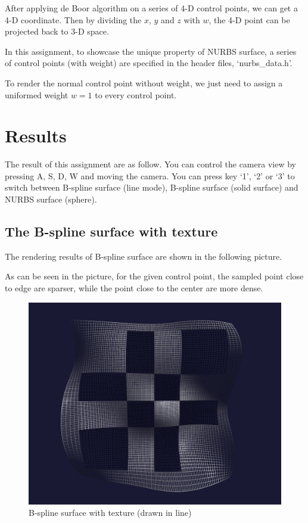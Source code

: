 \documentclass[acmtog]{acmart}
\begin{document}
After applying de Boor algorithm on a series of 4-D control points, we can get a 4-D coordinate. Then by dividing the $x$, $y$ and $z$ with $w$, the 4-D point can be projected back to 3-D space.


In this assignment, to showcase the unique property of NURBS surface, a series of control points (with weight) are specified in the header files, `nurbs\_data.h'.

To render the normal control point without weight, we just need to assign a uniformed weight $w = 1$ to every control point.

\section{Results}
The result of this assignment are as follow. You can control the camera view by pressing A, S, D, W and moving the camera. You can press key `1', `2' or `3' to switch between B-spline surface (line mode), B-spline surface (solid surface) and NURBS surface (sphere).


\subsection{The B-spline surface with texture}
The rendering results of B-spline surface are shown in the following picture.

As can be seen in the picture, for the given control point, the sampled point close to edge are sparser, while the point close to the center are more dense.

\begin{figure}[h]
	\centering
	\includegraphics[scale=0.25]{line.png}
	\caption{B-spline surface with texture (drawn in line)}
\end{figure}
\end{document}
